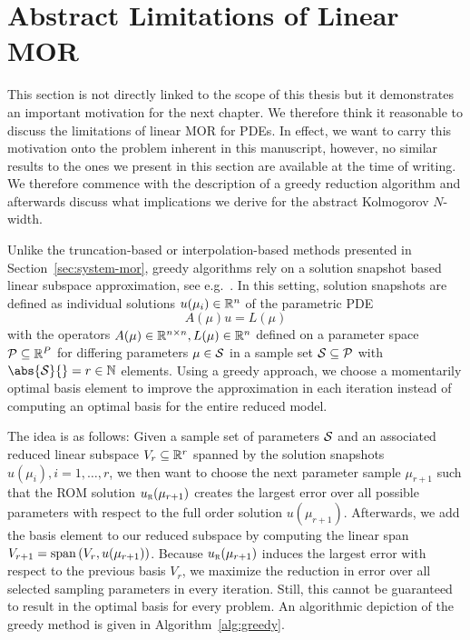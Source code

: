 \section{Abstract Limitations of Linear MOR}\label{sec:limitations-linear-mor}

This section is not directly linked to the scope of this thesis but it demonstrates an important motivation for the next chapter.
We therefore think it reasonable to discuss the limitations of linear MOR for \acp{PDE}.
In effect, we want to carry this motivation onto the problem inherent in this manuscript, however, no similar results to the ones we present in this section are available at the time of writing.
We therefore commence with the description of a greedy reduction algorithm and afterwards discuss what implications we derive for the abstract Kolmogorov $N$-width.

Unlike the truncation-based or interpolation-based methods presented in Section~\ref{sec:system-mor}, greedy algorithms rely on a solution snapshot based linear subspace approximation, see e.g.~\cite{Grepl2005, Rozza2008, Buffa2012}.
In this setting, solution snapshots are defined as individual solutions $u(\mu_i) \in \mathbb{R}^n$ of the parametric \ac{PDE}
\begin{equation}\label{eq:parametric-pde}
    A(\mu) u = L(\mu)
\end{equation}
with the operators $A(\mu) \in \mathbb{R}^{n \times n}, L(\mu) \in \mathbb{R}^n$ defined on a parameter space $\mathcal{P} \subseteq \mathbb{R}^P$ for differing parameters $\mu \in \mathcal{S}$ in a sample set $\mathcal{S} \subseteq \mathcal{P}$ with $\abs{\mcl{S}}{} = r \in \bb{N}$ elements.
Using a greedy approach, we choose a momentarily optimal basis element to improve the approximation in each iteration instead of computing an optimal basis for the entire reduced model.

The idea is as follows: Given a sample set of parameters $\mathcal{S}$ and an associated reduced linear subspace $V_r \subseteq \mathbb{R}^r$ spanned by the solution snapshots $u(\mu_i), i = 1, \dots, r$, we then want to choose the next parameter sample $\mu_{r + 1}$ such that the \ac{ROM} solution $u_{\textnormal{\scshape r}}(\mu_{r + 1})$ creates the largest error over all possible parameters with respect to the full order solution $u(\mu_{r + 1})$.
Afterwards, we add the basis element to our reduced subspace by computing the linear span $V_{r + 1} = \mathop{}\!\mathrm{span}\left(V_r, u(\mu_{r + 1})\right)$.
Because $u_{\textnormal{\scshape r}}(\mu_{r + 1})$ induces the largest error with respect to the previous basis $V_r$, we maximize the reduction in error over all selected sampling parameters in every iteration.
Still, this cannot be guaranteed to result in the optimal basis for every problem.
An algorithmic depiction of the greedy method is given in Algorithm~\ref{alg:greedy}.

